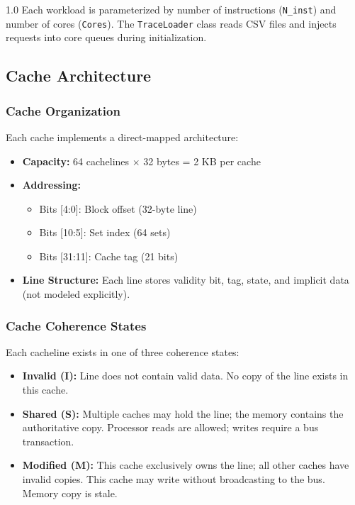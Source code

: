 \documentclass[12pt]{article}
\begin{document}
\begin{spacing}{1.0}
Each workload is parameterized by number of instructions (\texttt{N\_inst}) and number of cores (\texttt{Cores}). The \texttt{TraceLoader} class reads CSV files and injects requests into core queues during initialization.

\subsection{Cache Architecture}

\subsubsection{Cache Organization}

Each cache implements a direct-mapped architecture:

\begin{itemize}
    \item \textbf{Capacity:} 64 cachelines $\times$ 32 bytes = 2 KB per cache
    \item \textbf{Addressing:} 
    \begin{itemize}
        \item Bits [4:0]: Block offset (32-byte line)
        \item Bits [10:5]: Set index (64 sets)
        \item Bits [31:11]: Cache tag (21 bits)
    \end{itemize}
    \item \textbf{Line Structure:} Each line stores validity bit, tag, state, and implicit data (not modeled explicitly).
\end{itemize}

\subsubsection{Cache Coherence States}

Each cacheline exists in one of three coherence states:

\begin{itemize}
    \item \textbf{Invalid (I):} Line does not contain valid data. No copy of the line exists in this cache.
    \item \textbf{Shared (S):} Multiple caches may hold the line; the memory contains the authoritative copy. Processor reads are allowed; writes require a bus transaction.
    \item \textbf{Modified (M):} This cache exclusively owns the line; all other caches have invalid copies. This cache may write without broadcasting to the bus. Memory copy is stale.
\end{itemize}


\end{spacing}
\end{document}

